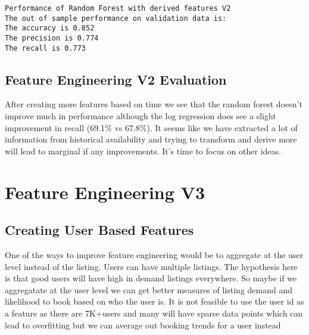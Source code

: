 \documentclass[11pt]{article}
\begin{document}
    \begin{Verbatim}[commandchars=\\\{\}]
Performance of Random Forest with derived features V2
The out of sample performance on validation data is:
The accuracy is 0.852
The precision is 0.774
The recall is 0.773

    \end{Verbatim}

    \subsection{Feature Engineering V2
Evaluation}\label{feature-engineering-v2-evaluation}

After creating more features based on time we see that the random forest
doesn't improve much in performance although the log regression does see
a slight improvement in recall (69.1\% vs 67.8\%). It seems like we have
extracted a lot of information from historical availability and trying
to transform and derive more will lead to marginal if any improvements.
It's time to focus on other ideas.

\section{Feature Engineering V3}\label{feature-engineering-v3}

\subsection{Creating User Based
Features}\label{creating-user-based-features}

One of the ways to improve feature engineering would be to aggregate at
the user level instead of the listing. Users can have multiple listings.
The hypothesis here is that good users will have high in demand listings
everywhere. So maybe if we aggregatate at the user level we can get
better measures of listing demand and likelihood to book based on who
the user is. It is not feasible to use the user id as a feature as there
are 7K+users and many will have sparse data points which can lead to
overfitting but we can average out booking trends for a user instead
\end{document}
